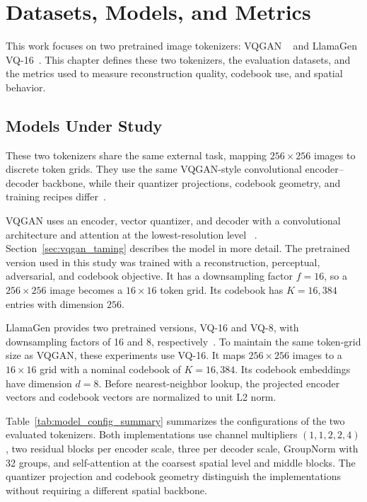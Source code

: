 \chapter{Datasets, Models, and Metrics}
\label{ch:datasets_models_metrics}


This work focuses on two pretrained image tokenizers: VQGAN
~\cite{esser2021taming} and LlamaGen VQ-16~\cite{sun2024llamagen}. This chapter
defines these two tokenizers, the evaluation datasets, and the metrics used to
measure reconstruction quality, codebook use, and spatial behavior.

\section{Models Under Study}
\label{sec:models_under_study}

These two tokenizers share the same external task, mapping $256\times256$
images to discrete token grids. They use the same VQGAN-style convolutional
encoder--decoder backbone, while their quantizer projections, codebook
geometry, and training recipes differ~\cite{esser2021taming,sun2024llamagen}.

VQGAN uses an encoder, vector quantizer, and decoder with a convolutional
architecture and attention at the lowest-resolution level
~\cite{esser2021taming}. Section~\ref{sec:vqgan_taming} describes the model in
more detail. The pretrained version used in this study was trained with a
reconstruction, perceptual, adversarial, and codebook objective. It has a
downsampling factor $f=16$, so a $256\times256$ image becomes a $16\times16$
token grid. Its codebook has $K=16{,}384$ entries with dimension $256$.

LlamaGen provides two pretrained versions, VQ-16 and VQ-8, with downsampling
factors of 16 and 8, respectively~\cite{sun2024llamagen,llamagengithub}. To
maintain the same token-grid size as VQGAN, these experiments use VQ-16. It maps
$256\times256$ images to a $16\times16$ grid with a nominal codebook of
$K=16{,}384$. Its codebook embeddings have dimension $d=8$. Before
nearest-neighbor lookup, the projected encoder vectors and codebook vectors are
normalized to unit L2 norm.

Table~\ref{tab:model_config_summary} summarizes the configurations of the two
evaluated tokenizers.
Both implementations use channel multipliers $(1,1,2,2,4)$, two residual
blocks per encoder scale, three per decoder scale, GroupNorm with 32 groups,
and self-attention at the coarsest spatial level and middle blocks. The
quantizer projection and codebook geometry distinguish the implementations
without requiring a different spatial backbone.

